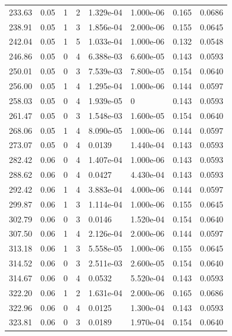 \documentclass[preview]{standalone}
\begin{document}
{{{\begin{tabular}{L{1.2cm}C{1.2cm} C{0.3cm}C{0.5cm} C{1.4cm}C{1.4cm} C{1.4cm}C{1.4cm}}
  233.63  &  0.05  & 1     &  2 &  1.329e-04  & 1.000e-06  & 0.165 &  0.0686   \\ 
  238.91  &  0.05  & 1     &  3 &  1.856e-04  & 2.000e-06  & 0.155 &  0.0645   \\ 
  242.04  &  0.05  & 1     &  5 &  1.033e-04  & 1.000e-06  & 0.132 &  0.0548   \\ 
  246.86  &  0.05  & 0     &  4 &  6.388e-03  & 6.600e-05  & 0.143 &  0.0593   \\ 
  250.01  &  0.05  & 0     &  3 &  7.539e-03  & 7.800e-05  & 0.154 &  0.0640   \\ 
  256.00  &  0.05  & 1     &  4 &  1.295e-04  & 1.000e-06  & 0.144 &  0.0597   \\ 
  258.03  &  0.05  & 0     &  4 &  1.939e-05  & 0  & 0.143 &  0.0593   \\ 
  261.47  &  0.05  & 0     &  3 &  1.548e-03  & 1.600e-05  & 0.154 &  0.0640   \\ 
  268.06  &  0.05  & 1     &  4 &  8.090e-05  & 1.000e-06  & 0.144 &  0.0597   \\ 
  273.07  &  0.05  & 0     &  4 &  0.0139  & 1.440e-04  & 0.143 &  0.0593   \\ 
  282.42  &  0.06  & 0     &  4 &  1.407e-04  & 1.000e-06  & 0.143 &  0.0593   \\ 
  288.62  &  0.06  & 0     &  4 &  0.0427  & 4.430e-04  & 0.143 &  0.0593   \\ 
  292.42  &  0.06  & 1     &  4 &  3.883e-04  & 4.000e-06  & 0.144 &  0.0597   \\ 
  299.87  &  0.06  & 1     &  3 &  1.114e-04  & 1.000e-06  & 0.155 &  0.0645   \\ 
  302.79  &  0.06  & 0     &  3 &  0.0146  & 1.520e-04  & 0.154 &  0.0640   \\ 
  307.50  &  0.06  & 1     &  4 &  2.126e-04  & 2.000e-06  & 0.144 &  0.0597   \\ 
  313.18  &  0.06  & 1     &  3 &  5.558e-05  & 1.000e-06  & 0.155 &  0.0645   \\ 
  314.52  &  0.06  & 0     &  3 &  2.511e-03  & 2.600e-05  & 0.154 &  0.0640   \\ 
  314.67  &  0.06  & 0     &  4 &  0.0532  & 5.520e-04  & 0.143 &  0.0593   \\ 
  322.20  &  0.06  & 1     &  2 &  1.631e-04  & 2.000e-06  & 0.165 &  0.0686   \\ 
  322.96  &  0.06  & 0     &  4 &  0.0125  & 1.300e-04  & 0.143 &  0.0593   \\ 
  323.81  &  0.06  & 0     &  3 &  0.0189  & 1.970e-04  & 0.154 &  0.0640   \\ 

\end{tabular}}}}
\end{document}
